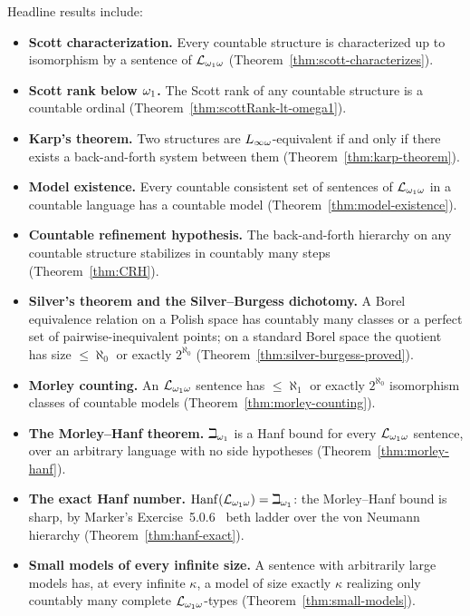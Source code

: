 Headline results include:
\begin{itemize}
  \item \textbf{Scott characterization.}
    Every countable structure is characterized up to isomorphism by
    a sentence of $\mathcal{L}_{\omega_1\omega}$ (Theorem~\ref{thm:scott-characterizes}).
  \item \textbf{Scott rank below $\omega_1$.}
    The Scott rank of any countable structure is a countable ordinal
    (Theorem~\ref{thm:scottRank-lt-omega1}).
  \item \textbf{Karp's theorem.}
    Two structures are $L_{\infty\omega}$-equivalent if and only if there exists
    a back-and-forth system between them (Theorem~\ref{thm:karp-theorem}).
  \item \textbf{Model existence.}
    Every countable consistent set of sentences of $\mathcal{L}_{\omega_1\omega}$ in a countable
    language has a countable model (Theorem~\ref{thm:model-existence}).
  \item \textbf{Countable refinement hypothesis.}
    The back-and-forth hierarchy on any countable structure stabilizes
    in countably many steps (Theorem~\ref{thm:CRH}).
  \item \textbf{Silver's theorem and the Silver--Burgess dichotomy.}
    A Borel equivalence relation on a Polish space has countably many classes
    or a perfect set of pairwise-inequivalent points; on a standard Borel space
    the quotient has size $\leq\aleph_0$ or exactly $2^{\aleph_0}$
    (Theorem~\ref{thm:silver-burgess-proved}).
  \item \textbf{Morley counting.}
    An $\mathcal{L}_{\omega_1\omega}$ sentence has $\leq\aleph_1$ or exactly $2^{\aleph_0}$
    isomorphism classes of countable models (Theorem~\ref{thm:morley-counting}).
  \item \textbf{The Morley--Hanf theorem.}
    $\beth_{\omega_1}$ is a Hanf bound for every $\mathcal{L}_{\omega_1\omega}$ sentence,
    over an arbitrary language with no side hypotheses
    (Theorem~\ref{thm:morley-hanf}).
  \item \textbf{The exact Hanf number.}
    $\mathrm{Hanf}(\mathcal{L}_{\omega_1\omega}) = \beth_{\omega_1}$: the Morley--Hanf bound is
    sharp, by Marker's Exercise~5.0.6~\cite{marker2016} beth ladder over the von Neumann hierarchy
    (Theorem~\ref{thm:hanf-exact}).
  \item \textbf{Small models of every infinite size.}
    A sentence with arbitrarily large models has, at every infinite $\kappa$, a
    model of size exactly $\kappa$ realizing only countably many complete
    $\mathcal{L}_{\omega_1\omega}$-types (Theorem~\ref{thm:small-models}).

\end{itemize}
